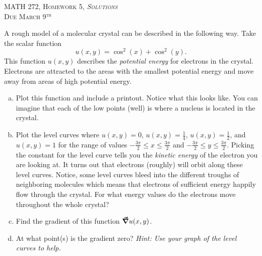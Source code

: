 \documentclass[12pt]{article} %
\begin{document}
\begin{center}
   \textsc{\large MATH 272, Homework 5, \emph{Solutions}}\\
   \textsc{Due March 9$^\textrm{th}$}
\end{center}
\vspace{.5cm}

\begin{problem}
A rough model of a molecular crystal can be described in the following way. Take the scalar function
\[
u(x,y)=\cos^2(x)+\cos^2(y).
\]
This function $u(x,y)$ describes the \emph{potential energy} for electrons in the crystal. Electrons are attracted to the areas with the smallest potential energy and move away from areas of high potential energy. 
\begin{enumerate}[(a)]
    \item Plot this function and include a printout.  Notice what this looks like.  You can imagine that each of the low points (well) is where a nucleus is located in the crystal.
    \item Plot the level curves where $u(x,y)=0$, $u(x,y)=\frac{1}{4}$, $u(x,y)=\frac{1}{2}$, and $u(x,y)=1$ for the range of values $-\frac{3\pi}{2}\leq x \leq \frac{3\pi}{2}$ and $-\frac{3\pi}{2}\leq y \leq \frac{3\pi}{2}$. Picking the constant for the level curve tells you the \emph{kinetic energy} of the electron you are looking at.  It turns out that electrons (roughly) will orbit along these level curves.  Notice, some level curves bleed into the different troughs of neighboring molecules which means that electrons of sufficient energy happily flow through the crystal. For what energy values do the electrons move throughout the whole crystal?
    \item Find the gradient of this function $\boldsymbol{\vec{\nabla}} u(x,y)$.
    \item At what point(s) is the gradient zero? \emph{Hint: Use your graph of the level curves to help.}
    \end{enumerate}
\end{problem}
\end{document}
